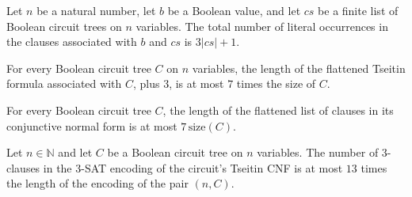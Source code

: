 \begin{theorem}
\label{BoolCircuit.gateClauses_flatten_length}
\leanok
{}
Let $n$ be a natural number, let $b$ be a Boolean value, and let $cs$ be a finite list
of Boolean circuit trees on $n$ variables. The total number of literal occurrences in
the clauses associated with $b$ and $cs$ is $3|cs|+1$.
\end{theorem}

\begin{theorem}
\label{BoolCircuit.tseitin_flatten_length_le}
\leanok
{}
For every Boolean circuit tree $C$ on $n$ variables, the length of the flattened Tseitin
formula associated with $C$, plus $3$, is at most $7$ times the size of $C$.
\end{theorem}

\begin{theorem}
\label{BoolCircuit.toCNF_flatten_length_le}
\leanok
{}
For every Boolean circuit tree $C$, the length of the flattened list of clauses in its
conjunctive normal form is at most $7\,\mathrm{size}(C)$.
\end{theorem}

\begin{theorem}
\label{BoolCircuit.length_to3SAT_toCNF_le}
\leanok
{}
Let $n\in\mathbb{N}$ and let $C$ be a Boolean circuit tree on $n$ variables. The number
of 3-clauses in the 3-SAT encoding of the circuit’s Tseitin CNF is at most $13$ times
the length of the encoding of the pair $(n,C)$.
\end{theorem}
